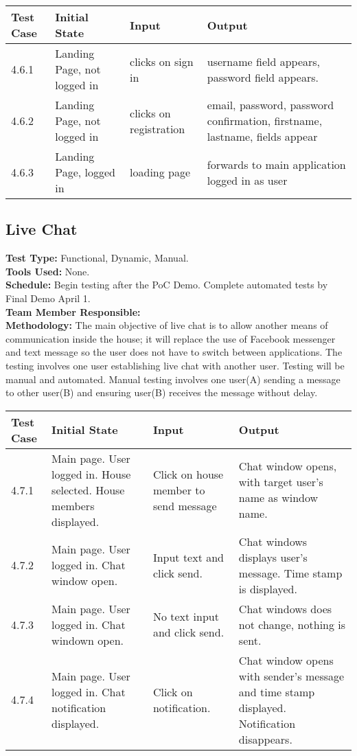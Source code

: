 \documentclass[12pt]{article}
\begin{document}
\begin{longtable}{|p{2cm}|p{3cm}|p{5cm}|p{5cm}|}
\hline
\textbf{Test Case}  & \textbf{Initial State} & \textbf{Input} & \textbf{Output} \\ \hline
4.6.1 & Landing Page, not logged in & clicks on sign in & username field appears, password field appears.\\
\hline
4.6.2 & Landing Page, not logged in & clicks on registration & email, password, password confirmation, firstname, lastname, fields appear\\
\hline
4.6.3 & Landing Page, logged in & loading page & forwards to main application logged in as user\\
\hline
\end{longtable}


\subsection{Live Chat}
\textbf{Test Type:} Functional, Dynamic, Manual. \\
\textbf{Tools Used:} None. \\
\textbf{Schedule:} Begin testing after the PoC Demo. Complete automated tests by Final Demo April 1. \\
\textbf{Team Member Responsible:} \\
\textbf{Methodology:} The main objective of live chat is to allow another means of communication inside the house; it will replace the use of Facebook messenger and text message so the user does not have to switch between applications. The testing involves one user establishing live chat with another user. Testing will be manual and automated. Manual testing involves one user(A) sending a message to other user(B) and ensuring user(B) receives the message without delay. 

\begin{longtable}[l]{|p{2cm}|p{3cm}|p{5cm}|p{5cm}|}
\hline
\textbf{Test Case}  & \textbf{Initial State} & \textbf{Input} & \textbf{Output} \\ \hline
4.7.1 & Main page. User logged in. House selected. House members displayed. & Click on house member to send message & Chat window opens, with target user's name as window name. \\ 
\hline
4.7.2 & Main page. User logged in. Chat window open. & Input text and click send. & Chat windows displays user's message. Time stamp is displayed. \\ 
\hline
4.7.3 & Main page. User logged in. Chat windown open. & No text input and click send. & Chat windows does not change, nothing is sent. \\ 
\hline
4.7.4 & Main page. User logged in. Chat notification displayed. & Click on notification. & Chat window opens with sender's message and time stamp displayed. Notification disappears. \\
\hline
\end{longtable}
\end{document}
